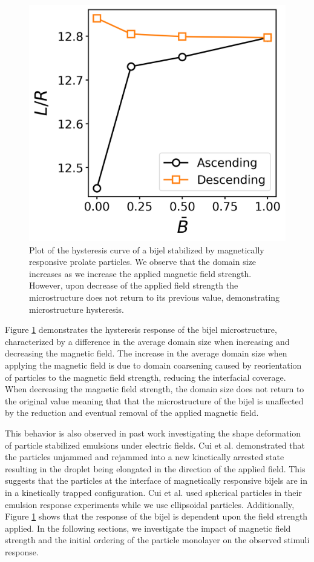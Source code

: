 \begin{figure} 
    \centering 
    \includegraphics[scale=0.5]{../figures/results/paper2/hysteresis_curve.png} 
    \caption{Plot of the hysteresis curve of a bijel stabilized by magnetically responsive prolate particles. We observe that the domain size increases as we 
    increase the applied magnetic field strength. However, upon decrease of the applied field strength the microstructure does not return to its previous value,
    demonstrating microstructure hysteresis.} 
    \label{fig:hysteresis_curve} 
\end{figure}

Figure \ref{fig:hysteresis_curve} demonstrates the hysteresis response of the bijel microstructure, characterized by a difference in the average domain size
when increasing and decreasing the magnetic field. The increase in the average domain size when applying the magnetic field is due to domain coarsening caused by 
reorientation of particles to the magnetic field strength, reducing the interfacial coverage. When decreasing the magnetic field strength, 
the domain size does not return to the original value meaning that that the microstructure of the bijel is unaffected by 
the reduction and eventual removal of the applied magnetic field. 

This behavior is also observed in past work investigating the shape deformation of particle stabilized emulsions under 
electric fields. \cite{cui_stabilizing_2013} Cui et al. demonstrated that the particles unjammed and rejammed into a new kinetically arrested state resulting in
the droplet being elongated in the direction of the applied field. This suggests that the particles at the interface of magnetically responsive bijels are in
in a kinetically trapped configuration. Cui et al. used spherical particles in their emulsion response experiments while we use ellipsoidal particles. Additionally,
Figure \ref{fig:hysteresis_curve} shows that the response of the bijel is dependent upon the field strength applied.
In the following sections, we investigate the impact of magnetic field strength and the initial ordering of the particle monolayer on the observed stimuli response.

